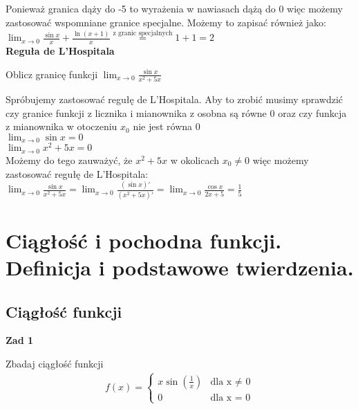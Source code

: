 \documentclass[main.tex]{subfiles}
\begin{document}
    \noindent Ponieważ granica dąży do -5 to wyrażenia w nawiasach dążą do 0 więc możemy zastosować wspomniane granice specjalne. Możemy to zapisać również jako: \\

    \noindent $\lim_{x \to 0} \frac{\sin{x}}{x} + \frac{\ln(x + 1)}{x} \stackrel{\text{z granic specjalnych}}{=} 1 + 1 = 2$ \\


    \noindent \textbf{Reguła de L'Hospitala} \\

    \begin{exercise}
        Oblicz granicę funkcji $\lim_{x \to 0} \frac{\sin{x}}{x^2 + 5x}$
    \end{exercise}

    \noindent Spróbujemy zastosować regułę de L'Hospitala. Aby to zrobić musimy sprawdzić czy granice funkcji z licznika i mianownika z osobna są równe 0 oraz czy funkcja z mianownika w otoczeniu $x_{0}$ nie jest równa 0 \\

    \noindent $\lim_{x \to 0} \sin{x} = 0$ \\
    \noindent $\lim_{x \to 0} x^2 + 5x = 0$ \\
    \noindent Możemy do tego zauważyć, że $x^2 + 5x$ w okolicach $x_{0} \neq 0$ więc możemy zastosować regułę de L'Hospitala: \\

    \noindent $\lim_{x \to 0} \frac{\sin{x}}{x^2 + 5x} = \lim_{x \to 0} \frac{(\sin{x})'}{(x^2 + 5x)'} = \lim_{x \to 0} \frac{\cos{x}}{2x + 5} = \frac{1}{5}$


    \newpage

    \section{Ciągłość i pochodna funkcji. Definicja i podstawowe twierdzenia.}

    \subsection{Ciągłość funkcji}

    \textbf{Zad 1} \\

    \begin{exercise}
        Zbadaj ciągłość funkcji
        \begin{align*}
            f(x) =
            \begin{cases}
                x \sin(\frac{1}{x}) & \text{dla x $\neq$ 0} \\
                0 & \text{dla x = 0}
            \end{cases}
        \end{align*}
    \end{exercise}
\end{document}

